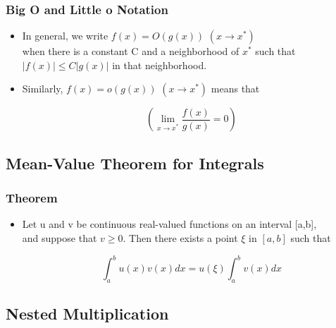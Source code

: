 \documentclass[notheorems,mathserif,table,compress]{beamer}  %
\begin{document}
\begin{frame}
  \frametitle{Big O and Little o Notation}
  \begin{itemize}
  \item In  general, we write $f(x)=O(g(x))$  $(x\rightarrow x^*)$\\
  when  there  is a constant  C and a   neighborhood of $x^*$ such  that  $|f(x)|\leq C|g(x)|$ in that neighborhood.
  \newline
  \item  Similarly, $f(x)=o(g(x))$ $(x\rightarrow x^*)$ means that 

  \begin{displaymath}
 (\lim_{x \to x^*}\frac {f(x)}{g(x)}=0)
  \end{displaymath} 

  \end{itemize}
\end{frame}

\subsection{Mean-Value Theorem  for Integrals }

\begin{frame}

  \frametitle{Theorem}
  \begin{itemize}
 \item Let u and v be continuous real-valued functions on an interval [a,b],\\
  and suppose  that $v \geq  0$. Then  there  exists a point $\xi$ in $[a,b]$ such that 

  \begin{displaymath}
  \int _{a}^{b} u(x)v(x)dx {=} u(\xi)\int_{a}^{b}v(x)dx
  \end{displaymath} 

  \end{itemize}
\end{frame}

\subsection{Nested Multiplication}
\end{document}
